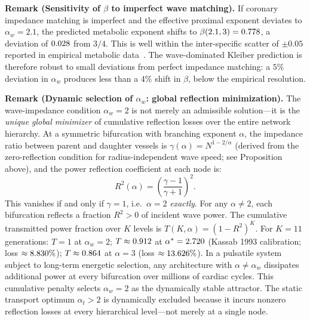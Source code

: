 \documentclass[11pt,a4paper]{article}
\theoremstyle{remark}
\begin{document}
\noindent\textbf{Remark (Sensitivity of $\beta$ to imperfect wave matching).} If coronary impedance matching is imperfect and the effective proximal exponent deviates to $\alpha_w = 2.1$, the predicted metabolic exponent shifts to $\beta(2.1, 3) = 0.778{}$, a deviation of $0.028{}$ from $3/4$. This is well within the inter-specific scatter of $\pm 0.05$ reported in empirical metabolic data~\cite{glazier2005, white2013}. The wave-dominated Kleiber prediction is therefore robust to small deviations from perfect impedance matching: a $5\%$ deviation in $\alpha_w$ produces less than a $4\%$ shift in $\beta$, below the empirical resolution.

\vspace{0.4em}
\noindent\textbf{Remark (Dynamic selection of $\alpha_w$: global reflection minimization).}
The wave-impedance condition $\alpha_w = 2$ is not merely an admissible
solution---it is the \emph{unique global minimizer} of cumulative reflection
losses over the entire network hierarchy. At a symmetric bifurcation with
branching exponent $\alpha$, the impedance ratio between parent and daughter
vessels is $\gamma(\alpha) = N^{1-2/\alpha}$ (derived from the zero-reflection
condition for radius-independent wave speed; see Proposition above), and the power reflection
coefficient at each node is:
\begin{equation}
R^2(\alpha) = \left(\frac{\gamma - 1}{\gamma + 1}\right)^2.
\end{equation}
This vanishes if and only if $\gamma = 1$, i.e.\ $\alpha = 2$ \emph{exactly}.
For any $\alpha \neq 2$, each bifurcation reflects a fraction $R^2 > 0$ of
incident wave power. The cumulative transmitted power fraction over $K$ levels
is $T(K,\alpha) = (1-R^2)^K$. For $K=11$ generations: $T = 1$ at $\alpha_w = 2$;
$T \approx 0.912{}$ at $\alpha^* = 2.720{}$ (Kassab 1993 calibration; loss $\approx
8.830{}\%$); $T \approx 0.864{}$ at $\alpha = 3$ (loss $\approx
13.626{}\%$). In a pulsatile system subject to long-term energetic
selection, any architecture with $\alpha \neq \alpha_w$ dissipates additional
power at every bifurcation over millions of cardiac cycles. This cumulative
penalty selects $\alpha_w = 2$ as the dynamically stable attractor. The static
transport optimum $\alpha_t > 2$ is dynamically excluded because it incurs
nonzero reflection losses at every hierarchical level---not merely at a single
node.
\end{document}
